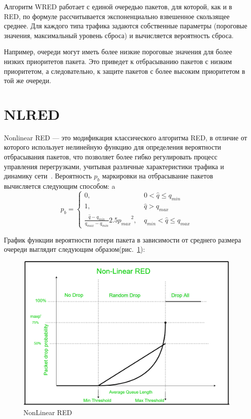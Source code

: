 Алгоритм WRED работает с единой очередью пакетов, для которой, как и в RED, по формуле рассчитывается экспоненциально взвешенное скользящее среднее. Для каждого типа трафика задаются собственные параметры (пороговые значения, максимальный уровень сброса) и вычисляется вероятность сброса.

Например, очереди могут иметь более низкие пороговые значения для более низких приоритетов пакета. Это приведет к отбрасыванию пакетов с низким приоритетом, а следовательно, к защите пакетов с более высоким приоритетом в той же очереди.

\section{NLRED}

Nonlinear RED — это модификация классического алгоритма RED, в отличие от которого использует нелинейную функцию для определения вероятности отбрасывания пакетов, что позволяет более гибко регулировать процесс управления перегрузками, учитывая различные характеристики трафика и динамику сети~\cite{NLRED1,NLRED2}. Вероятность $p_{b}$ маркировки на отбрасывание пакетов вычисляется следующим способом:   
a
$$
p_{b} = \begin{cases}
	0, &  \ 0 < \hat{q} \leq q_{min}
	\\
	1, &  \ \hat{q} > q_{max}
	\\
	\frac{\hat{q} - q_{min}}{q_{max} - q_{min}} {2.5p_{max}}^2, & \ q_{min} < \hat{q} \leqslant q_{max} 
\end{cases}
$$

График функции вероятности потери пакета в зависимости от среднего размера очереди выглядит следующим образом(рис.~\ref{fig:2.4}):

\begin{figure}[!h]
  \centering
  \includegraphics[width=0.7\linewidth]{image/NonLinearRED.png}
  \caption{NonLinear RED}
  \label{fig:2.4}
\end{figure}

